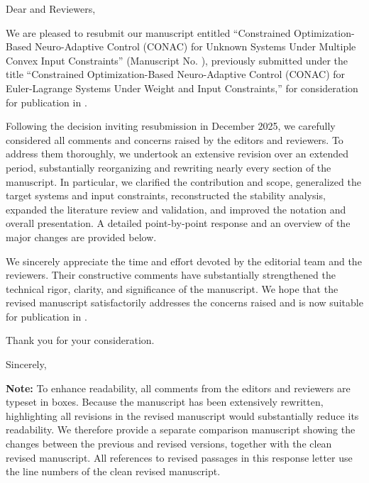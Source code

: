 Dear \theeditor\@ and Reviewers,

\vspace{1.7em}

We are pleased to resubmit our manuscript entitled “Constrained Optimization-Based Neuro-Adaptive Control (CONAC) for Unknown Systems Under Multiple Convex Input Constraints” (Manuscript No. \themanuscript), previously submitted under the title “Constrained Optimization-Based Neuro-Adaptive Control (CONAC) for Euler-Lagrange Systems Under Weight and Input Constraints,” for consideration for publication in \thejournal.

\vspace{0.7em}

Following the decision inviting resubmission in December 2025, we carefully considered all comments and concerns raised by the editors and reviewers. 
To address them thoroughly, we undertook an extensive revision over an extended period, substantially reorganizing and rewriting nearly every section of the manuscript. 
In particular, we clarified the contribution and scope, generalized the target systems and input constraints, reconstructed the stability analysis, expanded the literature review and validation, and improved the notation and overall presentation. 
A detailed point-by-point response and an overview of the major changes are provided below.

\vspace{0.7em}

We sincerely appreciate the time and effort devoted by the editorial team and the reviewers. 
Their constructive comments have substantially strengthened the technical rigor, clarity, and significance of the manuscript. 
We hope that the revised manuscript satisfactorily addresses the concerns raised and is now suitable for publication in \thejournal\@.

\vspace{1.2em}

Thank you for your consideration.

\vspace{1.2em}

Sincerely,

\vspace{1.7em}

\theauthor

\vspace{1.7em}

\newpage

\textbf{Note:} 
  To enhance readability, all comments from the editors and reviewers are typeset in boxes. 
  Because the manuscript has been extensively rewritten, highlighting all revisions in the revised manuscript would substantially reduce its readability.
  We therefore provide a separate comparison manuscript showing the changes between the previous and revised versions, together with the clean revised manuscript. 
  All references to revised passages in this response letter use the line numbers of the clean revised manuscript.

